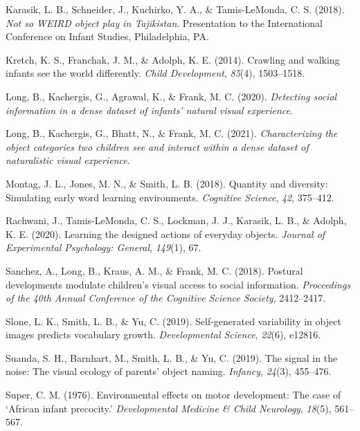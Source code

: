 \documentclass[10pt, letterpaper]{article}
\newenvironment{CSLReferences}%
  {}%
  {\par}
\begin{document}
\begin{CSLReferences}{1}{0}
\leavevmode\hypertarget{ref-karasik2018not}{}%
Karasik, L. B., Schneider, J., Kuchirko, Y. A., \& Tamis-LeMonda, C. S.
(2018). \emph{Not so {WEIRD} object play in {T}ajikistan}. {Presentation
to the International Conference on Infant Studies, Philadelphia, PA}.

\leavevmode\hypertarget{ref-kretch2014crawling}{}%
Kretch, K. S., Franchak, J. M., \& Adolph, K. E. (2014). Crawling and
walking infants see the world differently. \emph{Child Development},
\emph{85}(4), 1503--1518.

\leavevmode\hypertarget{ref-long2020detecting}{}%
Long, B., Kachergis, G., Agrawal, K., \& Frank, M. C. (2020).
\emph{Detecting social information in a dense dataset of infants'
natural visual experience}.

\leavevmode\hypertarget{ref-long2021characterizing}{}%
Long, B., Kachergis, G., Bhatt, N., \& Frank, M. C. (2021).
\emph{Characterizing the object categories two children see and interact
within a dense dataset of naturalistic visual experience}.

\leavevmode\hypertarget{ref-montag2018quantity}{}%
Montag, J. L., Jones, M. N., \& Smith, L. B. (2018). Quantity and
diversity: Simulating early word learning environments. \emph{Cognitive
Science}, \emph{42}, 375--412.

\leavevmode\hypertarget{ref-rachwani2020learning}{}%
Rachwani, J., Tamis-LeMonda, C. S., Lockman, J. J., Karasik, L. B., \&
Adolph, K. E. (2020). Learning the designed actions of everyday objects.
\emph{Journal of Experimental Psychology: General}, \emph{149}(1), 67.

\leavevmode\hypertarget{ref-sanchez2018detecting}{}%
Sanchez, A., Long, B., Kraus, A. M., \& Frank, M. C. (2018). Postural
developments modulate children's visual access to social information.
\emph{{Proceedings of the 40th Annual Conference of the Cognitive
Science Society}}, 2412--2417.

\leavevmode\hypertarget{ref-slone2019self}{}%
Slone, L. K., Smith, L. B., \& Yu, C. (2019). Self-generated variability
in object images predicts vocabulary growth. \emph{Developmental
Science}, \emph{22}(6), e12816.

\leavevmode\hypertarget{ref-suanda2019signal}{}%
Suanda, S. H., Barnhart, M., Smith, L. B., \& Yu, C. (2019). The signal
in the noise: The visual ecology of parents' object naming.
\emph{Infancy}, \emph{24}(3), 455--476.

\leavevmode\hypertarget{ref-super1976environmental}{}%
Super, C. M. (1976). Environmental effects on motor development: The
case of {`{A}frican infant precocity.'} \emph{Developmental Medicine \&
Child Neurology}, \emph{18}(5), 561--567.


\end{CSLReferences}
\end{document}
